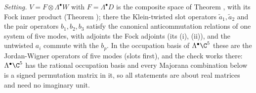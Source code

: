 \emph{Setting.} $V = F \otimes \Lambda^{\bullet}W$ with $F = \Lambda^{\bullet}D$ is the composite space of Theorem , with its Fock inner product (Theorem ); there the Klein-twisted slot operators $\tilde a_{1}, \tilde a_{2}$ and the pair operators $b_{1}, b_{2}, b_{3}$ satisfy the canonical anticommutation relations of one system of five modes, with adjoints the Fock adjoints (its (i), (ii)), and the untwisted $a_{i}$ commute with the $b_{p}$. In the occupation basis of $\Lambda^{\bullet}\C^{5}$ these are the Jordan-Wigner operators of five modes (slots first), and the check works there: $\Lambda^{\bullet}\C^{5}$ has the rational occupation basis and every Majorana combination below is a signed permutation matrix in it, so all statements are about real matrices and need no imaginary unit.


